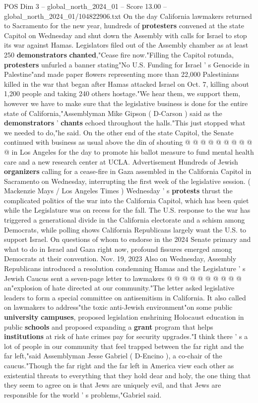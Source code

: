 \begin{textsample}{POS Dim 3 – global\_north\_2024\_01 – Score 13.00 – global\_north\_2024\_01/104822906.txt}  \label{ex:f3_pos_244}
On the day California lawmakers returned to Sacramento for the new year, hundreds of \textbf{protesters} convened at the state Capitol on Wednesday and shut down the Assembly with calls for Israel to stop its war against Hamas.
Legislators filed out of the Assembly chamber as at least 250 \textbf{demonstrators} \textbf{chanted},"Cease fire now."Filling the Capitol rotunda, \textbf{protesters} unfurled a banner stating"No U.S.
Funding for Israel ' s Genocide in Palestine"and made paper flowers representing more than 22,000 Palestinians killed in the war that began after Hamas attacked Israel on Oct. 7, killing about 1,200 people and taking 240 others hostage."We hear them, we support them, however we have to make sure that the legislative business is done for the entire state of California,"Assemblyman Mike Gipson ( D-Carson ) said as the \textbf{demonstrators} ' \textbf{chants} echoed throughout the halls."This just stopped what we needed to do,"he said.
On the other end of the state Capitol, the Senate continued with business as usual above the din of shouting @ @ @ @ @ @ @ @ @ @ in Los Angeles for the day to promote his ballot measure to fund mental health care and a new research center at UCLA.
Advertisement Hundreds of Jewish \textbf{organizers} calling for a cease-fire in Gaza assembled in the California Capitol in Sacramento on Wednesday, interrupting the first week of the legislative session. ( Mackenzie Mays / Los Angeles Times ) Wednesday ' s \textbf{protests} thrust the complicated politics of the war into the California Capitol, which has been quiet while the Legislature was on recess for the fall.
The U.S. response to the war has triggered a generational divide in the California electorate and a schism among Democrats, while polling shows California Republicans largely want the U.S. to support Israel.
On questions of whom to endorse in the 2024 Senate primary and what to do in Israel and Gaza right now, profound fissures emerged among Democrats at their convention.
Nov. 19, 2023 Also on Wednesday, Assembly Republicans introduced a resolution condemning Hamas and the Legislature ' s Jewish Caucus sent a seven-page letter to lawmakers @ @ @ @ @ @ @ @ @ @ an"explosion of hate directed at our community."The letter asked legislative leaders to form a special committee on antisemitism in California.
It also called on lawmakers to address"the toxic anti-Jewish environment"on some public \textbf{university} \textbf{campuses}, proposed legislation enshrining Holocaust education in public \textbf{schools} and proposed expanding a \textbf{grant} program that helps \textbf{institutions} at risk of hate crimes pay for security upgrades."I think there ' s a lot of people in our community that feel trapped between the far right and the far left,"said Assemblyman Jesse Gabriel ( D-Encino ), a co-chair of the caucus."Though the far right and the far left in America view each other as existential threats to everything that they hold dear and holy, the one thing that they seem to agree on is that Jews are uniquely evil, and that Jews are responsible for the world ' s problems,"Gabriel said.

\end{textsample}
